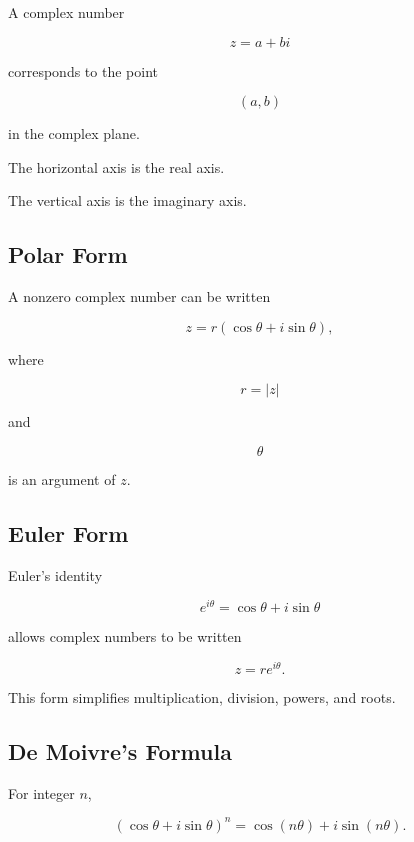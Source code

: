 A complex number

\[
z=a+bi
\]

corresponds to the point

\[
\boxed{
(a,b)
}
\]

in the complex plane.

The horizontal axis is the real axis.

The vertical axis is the imaginary axis.

\subsection{Polar Form}
\label{subsec:complex-polar-form-reference}

A nonzero complex number can be written

\[
\boxed{
z
=
r(\cos\theta+i\sin\theta),
}
\]

where

\[
r=|z|
\]

and

\[
\theta
\]

is an argument of \(z\).

\subsection{Euler Form}
\label{subsec:complex-euler-form-reference}

Euler's identity

\[
\boxed{
e^{i\theta}
=
\cos\theta+i\sin\theta
}
\]

allows complex numbers to be written

\[
\boxed{
z
=
re^{i\theta}.
}
\]

This form simplifies multiplication, division, powers, and roots.

\subsection{De Moivre's Formula}
\label{subsec:de-moivre-reference}

For integer \(n\),

\[
\boxed{
(\cos\theta+i\sin\theta)^n
=
\cos(n\theta)
+
i\sin(n\theta).
}
\]

